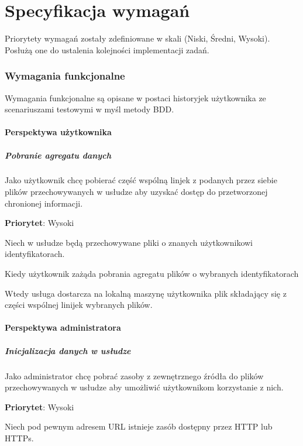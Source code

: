 \documentclass[a4paper,11pt]{article}
\begin{document}
\part{Specyfikacja wymagań}

Priorytety wymagań zostały zdefiniowane w skali (Niski, Średni, Wysoki).
Posłużą one do ustalenia kolejności implementacji zadań.

\section{Wymagania funkcjonalne}
Wymagania funkcjonalne są opisane w postaci historyjek użytkownika ze
scenariuszami testowymi w myśl metody BDD.  

\subsection{Perspektywa użytkownika}

\subsubsection{Pobranie agregatu danych}
Jako użytkownik chcę pobierać część wspólną linjek z podanych przez
siebie plików przechowywanych w usłudze aby uzyskać dostęp do
przetworzonej chronionej informacji.

\textbf{Priorytet}: Wysoki

Niech w usłudze będą przechowywane pliki o znanych użytkownikowi
identyfikatorach.

Kiedy użytkownik zażąda pobrania agregatu plików o wybranych
identyfikatorach

Wtedy usługa dostarcza na lokalną maszynę użytkownika plik składający
się z części wspólnej linijek wybranych plików.


\subsection{Perspektywa administratora}

\subsubsection{Inicjalizacja danych w usłudze}
Jako administrator chcę pobrać zasoby z zewnętrznego źródła do plików
przechowywanych w usłudze aby umożliwić użytkownikom korzystanie z nich.

\textbf{Priorytet}: Wysoki


Niech pod pewnym adresem URL istnieje zasób dostępny przez HTTP lub
HTTPs.
\end{document}
